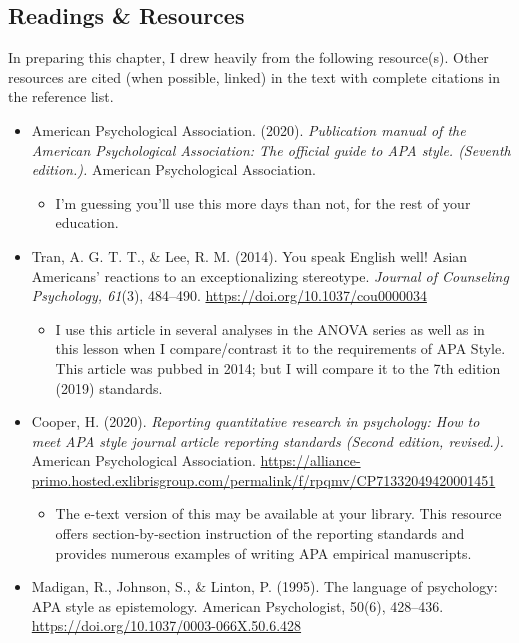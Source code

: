 \documentclass[
  11pt,
]{book}
\providecommand{\tightlist}{%
  \setlength{\itemsep}{0pt}\setlength{\parskip}{0pt}}
\begin{document}
\hypertarget{readings-resources}{%
\subsection{Readings \& Resources}\label{readings-resources}}

In preparing this chapter, I drew heavily from the following resource(s). Other resources are cited (when possible, linked) in the text with complete citations in the reference list.

\begin{itemize}
\tightlist
\item
  American Psychological Association. (2020). \emph{Publication manual of the American Psychological Association: The official guide to APA style. (Seventh edition.).} American Psychological Association.

  \begin{itemize}
  \tightlist
  \item
    I'm guessing you'll use this more days than not, for the rest of your education.
  \end{itemize}
\item
  Tran, A. G. T. T., \& Lee, R. M. (2014). You speak English well! Asian Americans' reactions to an exceptionalizing stereotype. \emph{Journal of Counseling Psychology, 61}(3), 484--490. \url{https://doi.org/10.1037/cou0000034}

  \begin{itemize}
  \tightlist
  \item
    I use this article in several analyses in the ANOVA series as well as in this lesson when I compare/contrast it to the requirements of APA Style. This article was pubbed in 2014; but I will compare it to the 7th edition (2019) standards.
  \end{itemize}
\item
  Cooper, H. (2020). \emph{Reporting quantitative research in psychology: How to meet APA style journal article reporting standards (Second edition, revised.).} American Psychological Association. \url{https://alliance-primo.hosted.exlibrisgroup.com/permalink/f/rpqmv/CP71332049420001451}

  \begin{itemize}
  \tightlist
  \item
    The e-text version of this may be available at your library. This resource offers section-by-section instruction of the reporting standards and provides numerous examples of writing APA empirical manuscripts.
  \end{itemize}
\item
  Madigan, R., Johnson, S., \& Linton, P. (1995). The language of psychology: APA style as epistemology. American Psychologist, 50(6), 428--436. \url{https://doi.org/10.1037/0003-066X.50.6.428}


\end{itemize}
\end{document}
